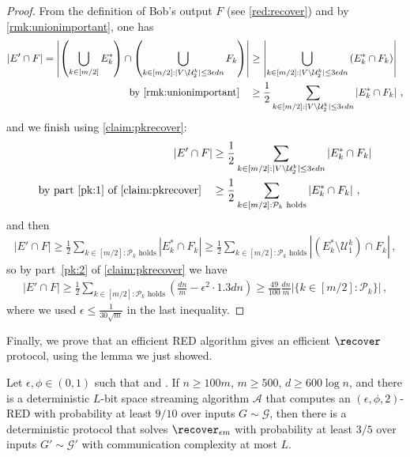 \begin{proof}
	\noindent
	From the definition of Bob's output $F$ (see \cref{red:recover}) and by \cref{rmk:unionimportant}, one has
	\begin{align*}
		|E' \cap F|  = \left| \left(\bigcup_{k \in [m/2]} E_k^*\right) \cap  \left(\bigcup_{k \in [m/2] : |V \setminus \mathcal{U}_2^k| \le 3\epsilon dn} F_k \right) \right|
		& \ge \left| \bigcup_{k\in [m/2] : |V \setminus \mathcal{U}_2^k| \le 3\epsilon dn}  \left( E_k^* \cap  F_k \right) \right| \\
		\text{by \cref{rmk:unionimportant}} \quad & \ge \frac{1}{2} \sum_{k\in [m/2] : |V \setminus \mathcal{U}_2^k| \le 3\epsilon dn}  \left| E_k^* \cap  F_k \right| \, ,
	\end{align*}
	and we finish using \cref{claim:pkrecover}:
	\begin{align*}
		|E' \cap F|  & \ge \frac{1}{2} \sum_{k\in [m/2] : |V \setminus \mathcal{U}_2^k| \le 3\epsilon dn}  \left| E_k^* \cap  F_k \right|  \\
		\text{by part~\eqref{pk:1} of \cref{claim:pkrecover}} \quad & \ge  \frac{1}{2} \sum_{k\in [m/2] : \mathcal{P}_k  \text{ holds}}  \left| E_k^* \cap  F_k \right| \, ,
	\end{align*}
	and then
		\begin{align*}
		|E' \cap F|  \ge  \frac{1}{2} \sum_{k\in [m/2] : \mathcal{P}_k  \text{ holds}}  \left| E_k^* \cap  F_k \right|  \ge  \frac{1}{2} \sum_{k\in [m/2] : \mathcal{P}_k \text{ holds}}  \left| (E^*_k \setminus \mathcal{U}^k_1) \cap F_k\right| \, , 
	\end{align*}
	so by part~\eqref{pk:2} of \cref{claim:pkrecover} we have
	\begin{align*}
		|E' \cap F|  \ge \frac{1}{2} \sum_{k\in [m/2] : \mathcal{P}_k  \text{ holds}} \left(\frac{dn}{m} -\epsilon^2 \cdot 1.3 dn\right)   \ge \frac{49}{100} \frac{dn}{m}  |\{k\in [m/2] : \mathcal{P}_k\}| \, ,
	\end{align*}
	where we used $\epsilon \le \frac{1}{30\sqrt{m}}$ in the last inequality.
\end{proof}
\noindent
Finally, we prove that an efficient RED algorithm gives an efficient $\recover$ protocol, using the lemma we just showed.
\begin{lemma} \label{lem:ind-recover}
	Let $\epsilon,\phi \in (0,1)$ such that  and . If $n \ge 100 m$, $m\ge 500$, $d \ge 600 \log n$, and there is a deterministic $L$-bit space streaming algorithm $\mathcal{A}$ that computes an $(\epsilon,\phi,2)$-RED with probability at least $9/10$ over inputs $G  \sim \mathcal{G}$, then there is a deterministic protocol that solves $\recover_{\epsilon m}$ with probability at least $3/5$ over inputs $G' \sim \mathcal{G}'$ with communication complexity at most $L$.
\end{lemma}
